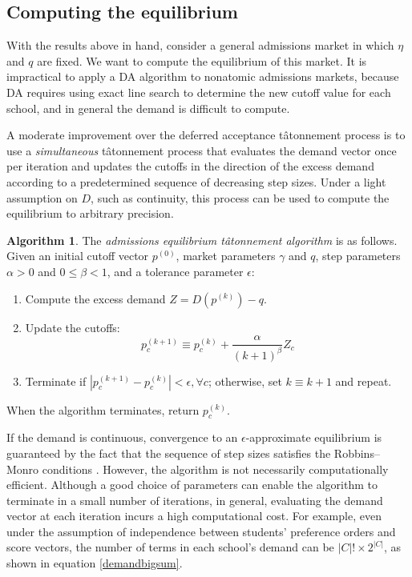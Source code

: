 \documentclass[12pt]{article}
\numberwithin{equation}{subsection}
\theoremstyle{definition}
\newtheorem{algorithm}{Algorithm}
\begin{document}
\subsection{Computing the equilibrium} \label{computingtheeq}
With the results above in hand, consider a general admissions market in which $\eta$ and $q$ are fixed. We want to compute the equilibrium of this market. It is impractical to apply a DA algorithm to nonatomic admissions markets, because DA requires using exact line search to determine the new cutoff value for each school, and in general the demand is difficult to compute.

A moderate improvement over the deferred acceptance t\^{a}tonnement process is to use a \emph{simultaneous} t\^{a}tonnement process \parencite[][equation 3]{walrastatonnement} that evaluates the demand vector once per iteration and updates the cutoffs in the direction of the excess demand according to a predetermined sequence of decreasing step sizes. Under a light assumption on $D$, such as continuity, this process can be used to compute the equilibrium to arbitrary precision.
\begin{algorithm} \label{admissionseqtatalgo}
The \emph{admissions equilibrium t\^{a}tonnement algorithm} is as follows. Given an initial cutoff vector $p^{(0)}$, market parameters $\gamma$ and $q$, step parameters $\alpha >0$ and $0 \leq \beta < 1$, and a tolerance parameter $\epsilon$:
\begin{enumerate}
\item Compute the excess demand $Z = D (p^{(k)}) - q$. 
\item Update the cutoffs:
\[ p_c^{(k+1)} \equiv p_c^{(k)} + \frac{\alpha}{(k+1)^\beta} Z_c\]
\item Terminate if $| p_c^{(k+1)} - p_c^{(k)} | < \epsilon, \forall c$; otherwise, set $k \equiv k+1$ and repeat. 
\end{enumerate}
When the algorithm terminates, return $p_c^{(k)}$. 
\end{algorithm}
If the demand is continuous, convergence to an $\epsilon$-approximate equilibrium is guaranteed by the fact that the sequence of step sizes satisfies the Robbins--Monro conditions \parencite[][]{robbinsmonro}. However, the algorithm is not necessarily computationally efficient. Although a good choice of parameters can enable the algorithm to terminate in a small number of iterations, in general, evaluating the demand vector at each iteration incurs a high computational cost. For example, even under the assumption of independence between students' preference orders and score vectors, the number of terms in each school's demand can be $|C|! \times 2^{|C|}$, as shown in equation \eqref{demandbigsum}.
\end{document}
